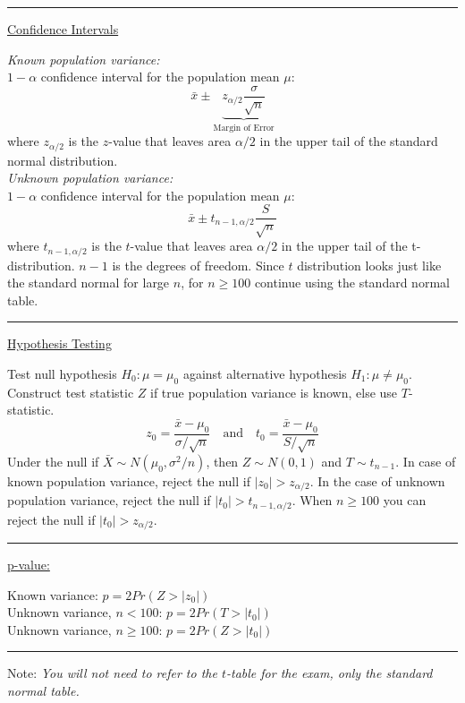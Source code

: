 \documentclass{./../../Latex/handout}
\begin{document}
\hrule 
\vspace{0.5em}          
\underline{Confidence Intervals} 

\textit{Known population variance:} \\
$1-\alpha$ confidence interval for the population mean $\mu$:
$$ \bar{x} \pm  \underbrace{z_{\alpha/2}  \frac{\sigma}{\sqrt{n}}}_{\text{Margin of Error}} $$
where $z_{\alpha/2}$ is the $z$-value that leaves area $\alpha/2$ in the upper tail of the standard normal distribution. \\

\textit{Unknown population variance:} \\
$1-\alpha$ confidence interval for the population mean $\mu$:
$$ \bar{x} \pm  t_{n-1,\alpha/2}  \frac{S}{\sqrt{n}} $$
where $t_{n-1,\alpha/2}$ is the $t$-value that leaves area $\alpha/2$ in the upper tail of the t-distribution. $n-1$ is the degrees of freedom. Since $t$ distribution looks just like the standard normal for large $n$, for $n\geq 100$ continue using the standard normal table. \\
\hrule 

\newpage
\underline{Hypothesis Testing} 

Test null hypothesis $ H_0: \mu = \mu_0 $ against alternative hypothesis $H_1: \mu \neq \mu_0$. Construct test statistic $Z$ if true population variance is known, else use $T$-statistic.  
 $$ z_0 = \frac{\bar{x}-\mu_0}{\sigma/\sqrt{n}} \quad \text{and} \quad t_0 = \frac{\bar{x}-\mu_0}{S/\sqrt{n}}  $$
Under the null if $\bar{X} \sim N(\mu_0, \sigma^2/n)$, then $Z \sim N(0,1)$ and $T \sim t_{n-1}$. 
In case of known population variance, reject the null if $|z_0|>z_{\alpha/2}$. In the case of unknown population variance, reject the null if $|t_0|>t_{n-1,\alpha/2}$. When $n \geq 100$ you can reject the null if $|t_0|>z_{\alpha/2}$. \\

\hrule \vspace{0.5em}
\underline{p-value:} 

Known variance: $ p = 2Pr(Z>|z_0|)$ \\
Unknown variance, $n<100$: $p=2Pr(T>|t_0|)$ \\
Unknown variance, $n \geq 100$:  $p=2Pr(Z>|t_0|)$ \\
\hrule \vspace{1em}
Note:\textit{ You will not need to refer to the $t$-table for the exam, only the standard normal table. 
}
\end{document}
